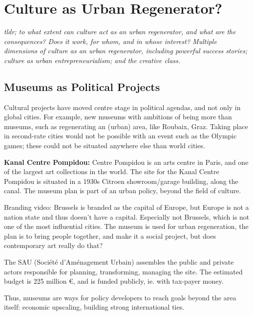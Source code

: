 \documentclass{article}
\begin{document}

\section{Culture as Urban Regenerator?}

\textit{tldr; to what extent can culture act as an urban regenerator, and what are the consequences? Does it work, for whom, and in whose interest? Multiple dimensions of culture as an urban regenerator, including powerful success stories; culture as urban entrepreneurialism; and the creative class.}

\subsection{Museums as Political Projects}

Cultural projects have moved centre stage in political agendas, and not only in global cities.
For example, new museums with ambitions of being more than museums, such as regenerating an (urban) area, like Roubaix, Graz. Taking place in second-rate cities would not be possible with an event such as the Olympic games; these could not be situated anywhere else than world cities.

\textbf{Kanal Centre Pompidou:} Centre Pompidou is an arts centre in Paris, and one of the largest art collections in the world.
The site for the Kanal Centre Pompidou is situated in a 1930s Citroen showroom/garage building, along the canal. 
The museum plan is part of an urban policy, beyond the field of culture. 

Branding video: Brussels is branded as the capital of Europe, but Europe is not a nation state and thus doesn't have a capital. Especially not Brussels, which is not one of the most influential cities. The museum is used for urban regeneration, the plan is to bring people together, and make it a social project, but does contemporary art really do that?

The SAU (Société d'Aménagement Urbain) assembles the public and private actors responsible for planning, transforming, managing the site. The estimated budget is 225 million €, and is funded publicly, ie. with tax-payer money.

Thus, museums are ways for policy developers to reach goals beyond the area itself: economic upscaling, building strong international ties.
\end{document}
